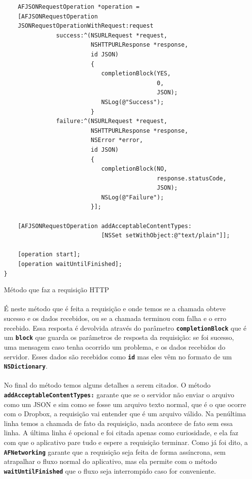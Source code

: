 \documentclass[a4paper,12pt,brazil,doubleside]{book}
\begin{document}
\begin{singlespace}
\begin{listing}[H]
\begin{verbatim}
    AFJSONRequestOperation *operation =
    [AFJSONRequestOperation
	JSONRequestOperationWithRequest:request
               success:^(NSURLRequest *request,
                         NSHTTPURLResponse *response,
                         id JSON)
                         {
                         	completionBlock(YES,
                         	                0,
                         	                JSON);
                         	NSLog(@"Success");
                         }
               failure:^(NSURLRequest *request,
                         NSHTTPURLResponse *response,
                         NSError *error,
                         id JSON)
                         {
                         	completionBlock(NO,
                         	                response.statusCode,
                         	                JSON);
                         	NSLog(@"Failure");
                         }];
                   
    [AFJSONRequestOperation addAcceptableContentTypes:
                            [NSSet setWithObject:@"text/plain"]];
    
    [operation start];
    [operation waitUntilFinished];
}
\end{verbatim}
\caption{Método que faz a requisição HTTP}
\end{listing}

\paragraph{}É neste método que é feita a requisição e onde temos se a chamada obteve sucesso e os dados recebidos, ou se a chamada terminou com falha e o erro recebido. Essa resposta é devolvida através do parâmetro \texttt{\textbf{completionBlock}} que é um \texttt{\textbf{block}} que guarda os parâmetros de resposta da requisição: se foi sucesso, uma mensagem caso tenha ocorrido um problema, e os dados recebidos do servidor. Esses dados são recebidos como \texttt{\textbf{id}} mas eles vêm no formato de um \texttt{\textbf{NSDictionary}}.
\paragraph{}No final do método temos alguns detalhes a serem citados. O método\\ \texttt{\textbf{addAcceptableContentTypes:}} garante que se o servidor não enviar o arquivo como um JSON e sim como se fosse um arquivo texto normal, que é o que ocorre com o Dropbox, a requisição vai entender que é um arquivo válido. Na penúltima linha temos a chamada de fato da requisição, nada acontece de fato sem essa linha. A última linha é opcional e foi citada apenas como curiosidade, e ela faz com que o aplicativo pare tudo e espere a requisição terminar. Como já foi dito, a \texttt{\textbf{AFNetworking}} garante que a requisição seja feita de forma assíncrona, sem atrapalhar o fluxo normal do aplicativo, mas ela permite com o método \texttt{\textbf{waitUntilFinished}} que o fluxo seja interrompido caso for conveniente.

\end{singlespace}
\end{document}
